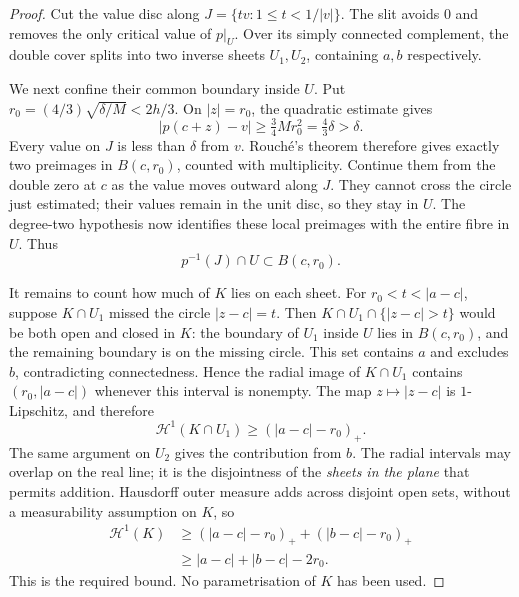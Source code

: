 \documentclass[11pt]{article}
\begin{document}
\begin{proof}
Cut the value disc along $J=\{tv:1\le t<1/|v|\}$. The slit avoids
$0$ and removes the only critical value of $p|_U$. Over its simply
connected complement, the double cover splits into two inverse sheets
$U_1,U_2$, containing $a,b$ respectively.

We next confine their common boundary inside $U$. Put
$r_0=(4/3)\sqrt{\delta/M}<2h/3$. On $|z|=r_0$, the quadratic estimate
gives
\[
 |p(c+z)-v|\ge\tfrac34Mr_0^2=\tfrac43\delta>\delta.
\]
Every value on $J$ is less than $\delta$ from $v$. Rouch\'e's theorem
therefore gives exactly two preimages in $B(c,r_0)$, counted with
multiplicity. Continue them from the double zero at $c$ as the value
moves outward along $J$. They cannot cross the circle just estimated;
their values remain in the unit disc, so they stay in $U$.
The degree-two hypothesis now identifies these local preimages with the
entire fibre in $U$. Thus
\[
 p^{-1}(J)\cap U\subset B(c,r_0).
\]

It remains to count how much of $K$ lies on each sheet. For
$r_0<t<|a-c|$, suppose $K\cap U_1$ missed the circle $|z-c|=t$.
Then $K\cap U_1\cap\{|z-c|>t\}$ would be both open and closed in $K$:
the boundary of $U_1$ inside $U$ lies in $B(c,r_0)$, and the remaining
boundary is on the missing circle. This set contains $a$ and excludes
$b$, contradicting connectedness. Hence the radial image of $K\cap U_1$
contains $(r_0,|a-c|)$ whenever this interval is nonempty. The map
$z\mapsto|z-c|$ is $1$-Lipschitz, and therefore
\[
 \mathcal H^1(K\cap U_1)\ge(|a-c|-r_0)_+.
\]
The same argument on $U_2$ gives the contribution from $b$. The radial
intervals may overlap on the real line; it is the disjointness of the
\emph{sheets in the plane} that permits addition. Hausdorff outer
measure adds across disjoint open sets, without a measurability
assumption on $K$, so
\begin{align*}
 \mathcal H^1(K)
 &\ge (|a-c|-r_0)_+ + (|b-c|-r_0)_+\\
 &\ge |a-c|+|b-c|-2r_0.
\end{align*}
This is the required bound. No parametrisation of $K$ has been used.
\end{proof}
\end{document}
